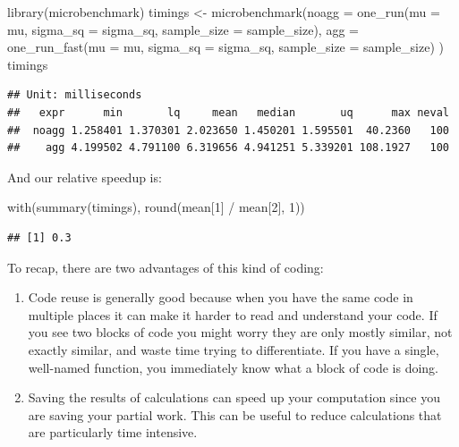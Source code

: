 \documentclass[
]{book}
\newenvironment{Shaded}{\begin{snugshade}}{\end{snugshade}}
\newcommand{\AttributeTok}[1]{\textcolor[rgb]{0.77,0.63,0.00}{#1}}
\newcommand{\DecValTok}[1]{\textcolor[rgb]{0.00,0.00,0.81}{#1}}
\newcommand{\FunctionTok}[1]{\textcolor[rgb]{0.00,0.00,0.00}{#1}}
\newcommand{\NormalTok}[1]{#1}
\newcommand{\OtherTok}[1]{\textcolor[rgb]{0.56,0.35,0.01}{#1}}
\newcommand{\SpecialCharTok}[1]{\textcolor[rgb]{0.00,0.00,0.00}{#1}}
\begin{document}
\begin{Shaded}
\begin{Highlighting}[]
\FunctionTok{library}\NormalTok{(microbenchmark)}
\NormalTok{timings }\OtherTok{\textless{}{-}} \FunctionTok{microbenchmark}\NormalTok{(}\AttributeTok{noagg =} \FunctionTok{one\_run}\NormalTok{(}\AttributeTok{mu =}\NormalTok{ mu, }\AttributeTok{sigma\_sq =}\NormalTok{ sigma\_sq, }
                                          \AttributeTok{sample\_size =}\NormalTok{ sample\_size),}
                          \AttributeTok{agg =} \FunctionTok{one\_run\_fast}\NormalTok{(}\AttributeTok{mu =}\NormalTok{ mu, }\AttributeTok{sigma\_sq =}\NormalTok{ sigma\_sq, }
                                             \AttributeTok{sample\_size =}\NormalTok{ sample\_size) )}
\NormalTok{timings}
\end{Highlighting}
\end{Shaded}

\begin{verbatim}
## Unit: milliseconds
##   expr      min       lq     mean   median       uq      max neval
##  noagg 1.258401 1.370301 2.023650 1.450201 1.595501  40.2360   100
##    agg 4.199502 4.791100 6.319656 4.941251 5.339201 108.1927   100
\end{verbatim}

And our relative speedup is:

\begin{Shaded}
\begin{Highlighting}[]
\FunctionTok{with}\NormalTok{(}\FunctionTok{summary}\NormalTok{(timings), }\FunctionTok{round}\NormalTok{(mean[}\DecValTok{1}\NormalTok{] }\SpecialCharTok{/}\NormalTok{ mean[}\DecValTok{2}\NormalTok{], }\DecValTok{1}\NormalTok{))}
\end{Highlighting}
\end{Shaded}

\begin{verbatim}
## [1] 0.3
\end{verbatim}

To recap, there are two advantages of this kind of coding:

\begin{enumerate}
\def\labelenumi{\arabic{enumi}.}
\item
  Code reuse is generally good because when you have the same code in multiple places it can make it harder to read and understand your code. If you see two blocks of code you might worry they are only mostly similar, not exactly similar, and waste time trying to differentiate. If you have a single, well-named function, you immediately know what a block of code is doing.
\item
  Saving the results of calculations can speed up your computation since you are saving your partial work. This can be useful to reduce calculations that are particularly time intensive.
\end{enumerate}
\end{document}
